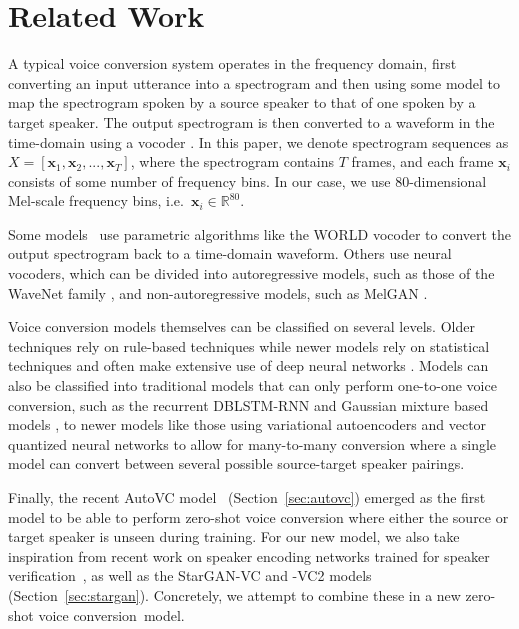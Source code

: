 \section{Related Work}
A typical voice conversion system operates in the frequency domain, first converting an input utterance into a spectrogram and then using some model to map the spectrogram spoken by a source speaker to that of one spoken by a target speaker.
The output spectrogram is then converted to a waveform in the time-domain using
a vocoder \cite{metaanalysis}.
In this paper, we denote spectrogram sequences as $X = [\mathbf{x}_1, \mathbf{x}_2, ..., \mathbf{x}_T]$, where the spectrogram contains $T$ frames, and each frame $\mathbf{x}_i$ consists of some number of frequency bins.
In our case, we use 80-dimensional Mel-scale frequency bins, i.e.\  
$\mathbf{x}_i \in \mathbb{R}^{80}$.

Some models~\cite{vtln-vc,stargan-vc}
use parametric algorithms like the WORLD vocoder \cite{WORLD-vocoder} to convert the output spectrogram 
back to a time-domain waveform.
Others use neural vocoders, which can be 
divided into autoregressive models, such as those of the WaveNet family \cite{wavenet}, and non-autoregressive models, such as MelGAN \cite{MelGAN}. 

Voice conversion models themselves can be classified on several levels.
Older techniques rely on rule-based techniques \cite{rules-vc-1,rules-vc-2} while newer models rely on statistical techniques and often make extensive use of deep neural networks \cite{metaanalysis}.
Models can also be classified into traditional models that can only perform one-to-one voice conversion, such as the recurrent DBLSTM-RNN \cite{BDLSTM} and Gaussian mixture based models \cite{gmm-vc-1,gmm-vc-2}, to newer models like those using variational autoencoders \cite{autovc,autoencoder-vc2} and vector quantized neural networks \cite{vqvae-comparisons} to allow for many-to-many conversion where a single model can convert between several possible source-target speaker pairings.

Finally, the recent AutoVC model~\cite{autovc} (Section~\ref{sec:autovc}) emerged as the first model to be able to perform zero-shot voice conversion where either the source or target speaker is unseen during training.
For our new model, we also take inspiration from recent work on speaker encoding networks trained for speaker verification~\cite{GE2E}, as well as the StarGAN-VC and -VC2 \cite{stargan-vc,stargan-vc2} models (Section~\ref{sec:stargan}). Concretely, we attempt to combine these in a new zero-shot voice conversion~model.

